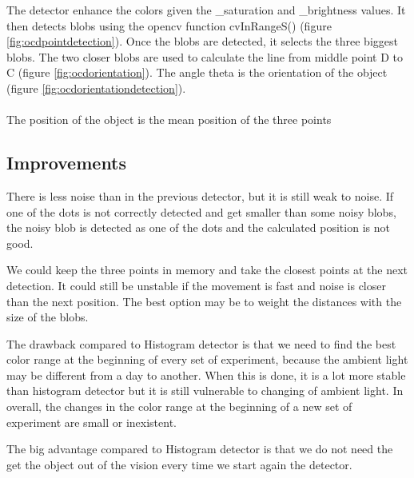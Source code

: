 The detector enhance the colors given the \_saturation and \_brightness 
values. It then detects blobs using the opencv function cvInRangeS() 
(figure \ref{fig:ocdpointdetection}).
Once the blobs are detected, it selects the three biggest blobs. The 
two closer blobs are used to calculate the line from middle point D to C (figure 
\ref{fig:ocdorientation}). 
The angle theta is the orientation of the object (figure \ref{fig:ocdorientationdetection}).
\\
\\
The position of the object is the mean position of the three points

\subsection{Improvements}
\label{sec:ocd:improvements}

There is less noise than in the previous detector, but it is still 
weak to noise. If one of the dots is not correctly detected and get 
smaller than some noisy blobs, the noisy blob is detected as one of 
the dots and the calculated position is not good.

We could keep the three points in memory and take the closest points 
at the next detection. It could still be unstable if the movement is 
fast and noise is closer than the next position. The best option may 
be to weight the distances with the size of the blobs. 

The drawback compared to Histogram detector is that we need to find 
the best color range at the beginning of every set of experiment, 
because the ambient light may be different from a day to another. When 
this is done, it is a lot more stable than histogram detector but it 
is still vulnerable to changing of ambient light. In overall, the changes 
in the color range at the beginning of a new set of experiment are 
small or inexistent.

The big advantage compared to Histogram detector is that we do not need 
the get the object out of the vision every time we start again the 
detector. 



